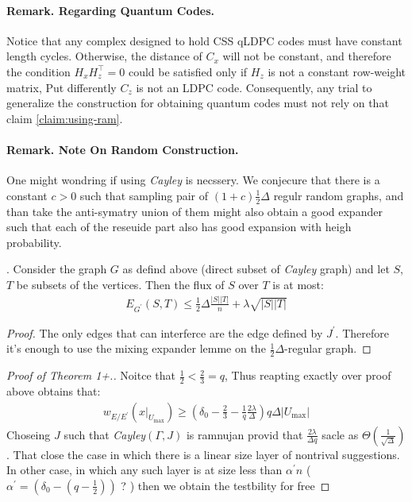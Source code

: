   \paragraph{Remark. Regarding Quantum Codes.} Notice that any complex designed to hold CSS qLDPC codes must have constant length cycles. Otherwise, the distance of $C_{x}$ will not be constant, and therefore the condition $H_{x}H_{z}^{\top} =0$ could be satisfied only if $H_{z}$ is not a constant row-weight matrix, Put differently $C_{z}$ is not an LDPC code. Consequently, any trial to generalize the construction for obtaining quantum codes must not rely on that claim \cref{claim:using-ram}.    

  \paragraph{Remark. Note On Random Construction.} One might wondring if using \emph{Cayley} is necssery. We conjecure that there is a constant $c > 0$ such that sampling pair of  $\left( 1 + c \right)\frac{1}{2}\Delta$ regulr random graphs, and than take the anti-symatry union of them might also obtain a good expander such that each of the reseuide part also has good expansion with heigh probability.  
  \begin{lemma} . Consider the graph $G$ as defind above (direct subset of \emph{Cayley} graph) and let $S$, $T$ be subsets of the vertices. Then the flux of $S$ over $T$ is at most: 
  \begin{equation*}
    \begin{split}
      E_{G^{\prime}}(S,T) \le \frac{1}{2} \Delta\frac{|S||T|}{n} + \lambda\sqrt{|S||T|} 
    \end{split}
  \end{equation*} 
\end{lemma}
  \begin{proof} The only edges that can interferce are the edge defined by $J^{\prime}$. Therefore it's enough to use the mixing expander lemme on the $\frac{1}{2}\Delta$-regular graph. \end{proof}


  \begin{proof}[Proof of Theorem 1+.] Noitce that $\frac{1}{2} < \frac{2}{3} = q$, Thus reapting exactly over proof above obtains that: 
  \begin{equation*}
    \begin{split}
      w_{E/E^{\prime}}\left( x|_{U_{\text{max}}} \right) \ge \left( \delta_{0} - \frac{2}{3} - \frac{1}{q}\frac{2\lambda}{\Delta} \right)q\Delta |U_{\text{max}}|
    \end{split}
  \end{equation*}
  Choseing $J$ such that \emph{Cayley}$\left( \Gamma, J \right)$ is ramnujan provid that $ \frac{2\lambda}{\Delta q}$ sacle as $\Theta\left( \frac{1}{\sqrt{\Delta}} \right)$. That close the case in which there is a linear size layer of nontrival suggestions. In other case, in which any such layer is at size less than $\alpha^{\prime}n$ ( $\alpha^{\prime} = \left( \delta_{0} - \left( q - \frac{1}{2} \right) \right)$ ? ) then we obtain the testbility for free
\end{proof}
